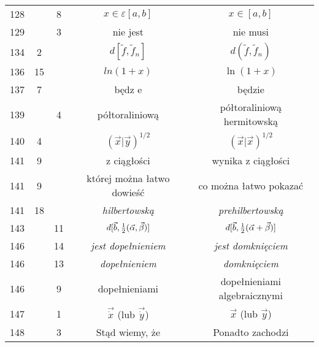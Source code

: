 \documentclass[a4paper,11pt]{article}
\newcommand{\veps}{\varepsilon}
\begin{document}
\begin{center}
\begin{tabular}{|c|c|c|c|c|}
    128 & &  8 & $x \in \veps [ a, b ]$ & $x \in [ a, b ]$ \\
    129 & &  3 & nie jest & nie musi \\
    134 &  2 & & $d[ \tilde{ f }, \tilde{ f }_{ n } ]$
           & $d( \tilde{ f }, \tilde{ f }_{ n } )$ \\
    136 & 15 & & $ln( 1 + x )$ & $\ln( 1 + x )$ \\
    137 &  7 & & będz e & będzie \\
    139 & &  4 & półtoraliniową & półtoraliniową hermitowską \\
    140 &  4 & & $( \vec{ x } | \vec{ y } )^{ 1 / 2 }$
           & $( \vec{ x } | \vec{ x } )^{ 1 / 2 }$ \\
    141 &  9 & & z ciągłości & wynika z ciągłości \\
    141 &  9 & & której można łatwo dowieść & co można łatwo pokazać \\
    141 & 18 & & \emph{hilbertowską} & \emph{prehilbertowską} \\
    143 & & 11 & $d[ \vec{ b }, \frac{ 1 }{ 2 } ( \vec{ \alpha },
                 \vec{ \beta }) ]$ 
           & $d[ \vec{ b }, \frac{ 1 }{ 2 } ( \vec{ \alpha }
             + \vec{ \beta }) ]$ \\
    146 & & 14 & \emph{jest dopełnieniem} & \emph{jest domknięciem} \\
    146 & & 13 & \emph{dopełnieniem} & \emph{domknięciem} \\
    146 & &  9 & dopełnieniami & dopełnieniami algebraicznymi \\
    147 & &  1 & $\vec{ \dot{ x } }$ (lub $\vec{ \dot{ y } }$)
           & $\vec{ x }$ (lub $\vec{ y }$) \\
    148 & &  3 & Stąd wiemy, że & Ponadto zachodzi \\
    \hline
  \end{tabular}


\end{center}
\end{document}
